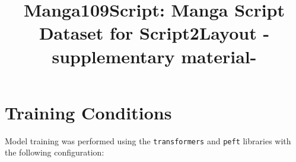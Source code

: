 \documentclass[sigconf, screen, review, nonacm, anonymous]{acmart}
\begin{document}
\title{Manga109Script: Manga Script Dataset for Script2Layout -supplementary material-}

\maketitle
\appendix
\renewcommand\thefigure{\thesection.\arabic{figure}}    

\section{Training Conditions}
Model training was performed using the \texttt{transformers} and \texttt{peft} libraries with the following configuration:
\end{document}
